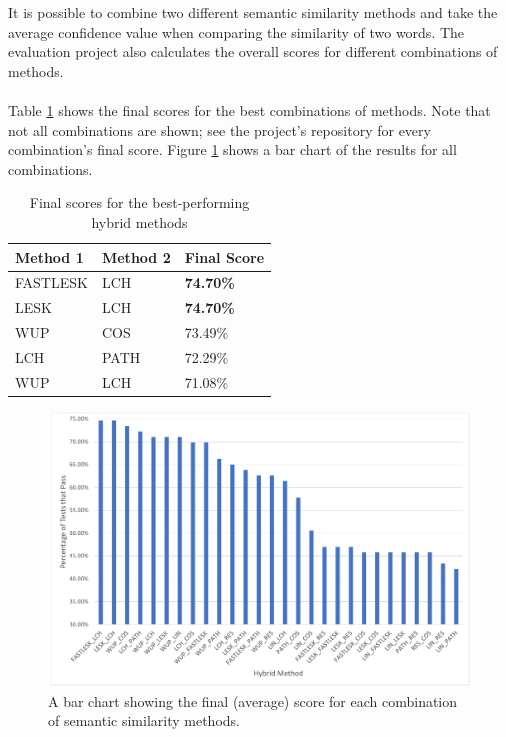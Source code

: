 \documentclass[11pt]{article}
\begin{document}
It is possible to combine two different semantic similarity methods and take the average confidence value when comparing the similarity of two words. The evaluation project also calculates the overall scores for different combinations of methods.
\\
\\
Table \ref{table:hybrid-results} shows the final scores for the best combinations of methods. Note that not all combinations are shown; see the project's repository for every combination's final score. Figure \ref{fig:hybrid-results-bar-chart} shows a bar chart of the results for all combinations.
\\
\begin{table}[H]
\centering
\caption{Final scores for the best-performing hybrid methods}
\label{table:hybrid-results}
\begin{tabular}{l|l|l}
\textbf{Method 1} & \textbf{Method 2} & \textbf{Final Score} \\ \hline
FASTLESK              & LCH               & \textbf{74.70\%}     \\ \hline
LESK               & LCH               & \textbf{74.70\%}              \\ \hline
WUP               & COS              & 73.49\%              \\ \hline
LCH          & PATH               & 72.29\%              \\ \hline
WUP               & LCH          & 71.08\%            
\end{tabular}
\end{table}

\begin{figure}[H]
\begin{center}
  \includegraphics[width=\textwidth]{hybrid-scores-bar-chart.pdf}
  \caption{A bar chart showing the final (average) score for each combination of semantic similarity methods.}
  \label{fig:hybrid-results-bar-chart}
  \end{center}
\end{figure}
\end{document}
